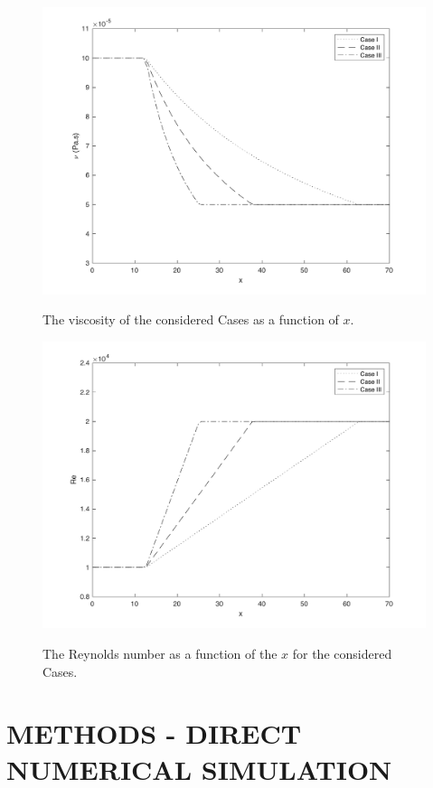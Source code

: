 \documentclass[twocolumn,10pt]{asme2e}
\begin{document}
\begin{figure}[t]
	\centering
	\scalebox{0.5}
	{\includegraphics{viscosity.pdf}}
	\caption{The viscosity of the considered Cases as a function of \(x\).}
	\label{fig:viscosity}
	\end{figure}

\begin{figure}[t]
	\centering
	\scalebox{0.5}
	{\includegraphics{reynolds.pdf}}
	\caption{The Reynolds number as a function of the \(x\) for the considered Cases.}
	\label{fig:reynolds}
\end{figure}

\section*{METHODS - DIRECT NUMERICAL SIMULATION}
\end{document}
